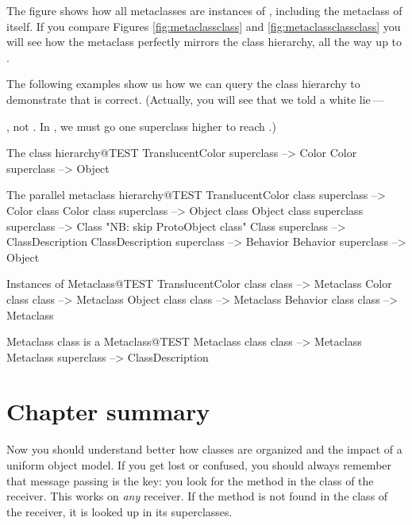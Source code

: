 \documentclass[a4paper,10pt,twoside]{book}
\begin{document}
The figure shows how all metaclasses are instances of , including the metaclass of  itself.
If you compare Figures \ref{fig:metaclassclass} and \ref{fig:metaclassclassclass} you will see how the metaclass  perfectly mirrors the class hierarchy, all the way up to .

The following examples show us how we can query the class hierarchy to demonstrate that  is correct.
(Actually, you will see that we told a white lie\,---\, {, not . In \sq, we must go one superclass higher to reach .)

\begin{example}{The class hierarchy}{@TEST}
TranslucentColor superclass --> Color
Color superclass                   --> Object
\end{example}

\begin{example}{The parallel metaclass hierarchy}{@TEST}
TranslucentColor class superclass   --> Color class
Color class superclass                     --> Object class
Object class superclass superclass --> Class    "NB: skip ProtoObject class"
Class superclass                              --> ClassDescription
ClassDescription superclass            --> Behavior
Behavior superclass                         --> Object
\end{example}

\begin{example}{Instances of Metaclass}{@TEST}
TranslucentColor class class --> Metaclass
Color class class                   --> Metaclass
Object class class                 --> Metaclass
Behavior class class              --> Metaclass
\end{example}
\begin{example}{Metaclass class is a Metaclass}{@TEST}
Metaclass class class --> Metaclass
Metaclass superclass --> ClassDescription
\end{example}

\section{Chapter summary}
Now you should understand better how classes are organized and the impact of a uniform object model. If you get lost or confused, you should always remember that message passing is the key: you look for the method in the class of the receiver. 
This works on \emph{any} receiver. 
If the method is not found in the class of the receiver, it is looked up in its superclasses.

}
\end{document}
